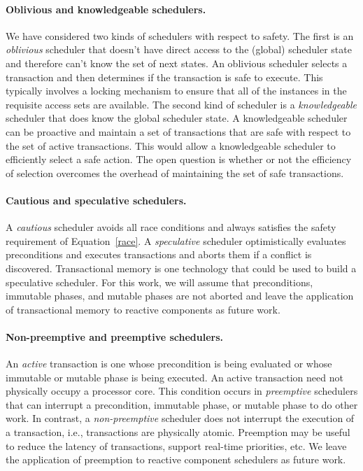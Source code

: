 \paragraph{Oblivious and knowledgeable schedulers.}
We have considered two kinds of schedulers with respect to safety.
The first is an \emph{oblivious} scheduler that doesn't have direct access to the (global) scheduler state and therefore can't know the set of next states.
An oblivious scheduler selects a transaction and then determines if the transaction is safe to execute.
This typically involves a locking mechanism to ensure that all of the instances in the requisite access sets are available.
The second kind of scheduler is a \emph{knowledgeable} scheduler that does know the global scheduler state.
A knowledgeable scheduler can be proactive and maintain a set of transactions that are safe with respect to the set of active transactions.
This would allow a knowledgeable scheduler to efficiently select a safe action.
The open question is whether or not the efficiency of selection overcomes the overhead of maintaining the set of safe transactions.

\paragraph{Cautious and speculative schedulers.}
A \emph{cautious} scheduler avoids all race conditions and always satisfies the safety requirement of Equation~\ref{race}.
A \emph{speculative} scheduler optimistically evaluates preconditions and executes transactions and aborts them if a conflict is discovered.
Transactional memory is one technology that could be used to build a speculative scheduler.
For this work, we will assume that preconditions, immutable phases, and mutable phases are not aborted and leave the application of transactional memory to reactive components as future work.

\paragraph{Non-preemptive and preemptive schedulers.}
An \emph{active} transaction is one whose precondition is being evaluated or whose immutable or mutable phase is being executed.
An active transaction need not physically occupy a processor core.
This condition occurs in \emph{preemptive} schedulers that can interrupt a precondition, immutable phase, or mutable phase to do other work.
In contrast, a \emph{non-preemptive} scheduler does not interrupt the execution of a transaction, i.e., transactions are physically atomic.
Preemption may be useful to reduce the latency of transactions, support real-time priorities, etc.
We leave the application of preemption to reactive component schedulers as future work.

